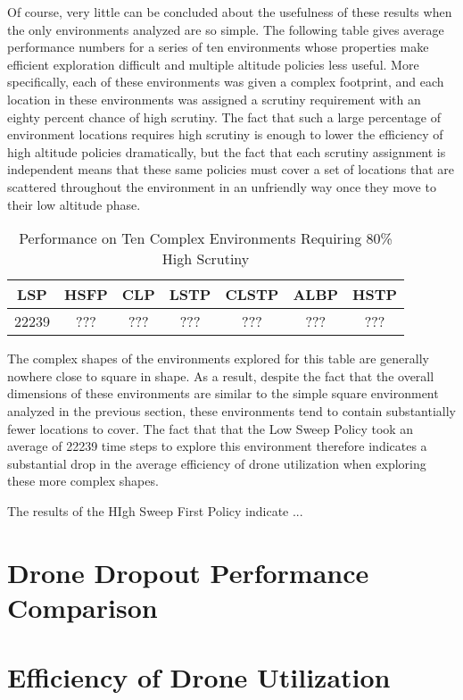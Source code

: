 Of course, very little can be concluded about the usefulness of these results when the only environments analyzed are so simple. The following table gives average performance numbers for a series of ten environments whose properties make efficient exploration difficult and multiple altitude policies less useful. More specifically, each of these environments was given a complex footprint, and each location in these environments was assigned a scrutiny requirement with an eighty percent chance of high scrutiny. The fact that such a large percentage of environment locations requires high scrutiny is enough to lower the efficiency of high altitude policies dramatically, but the fact that each scrutiny assignment is independent means that these same policies must cover a set of locations that are scattered throughout the environment in an unfriendly way once they move to their low altitude phase.

\begin{table}[h]
\begin{center}
 \begin{tabular}{||c c c c c c c ||}
 \hline
 LSP   & HSFP  & CLP & LSTP & CLSTP & ALBP & HSTP \\
 \hline
 22239 & ??? & ??? & ??? & ??? & ??? & ??? \\
 \hline
 \end{tabular}
\end{center}
\caption{Performance on Ten Complex Environments Requiring 80\% High Scrutiny}
\end{table}

The complex shapes of the environments explored for this table are generally nowhere close to square in shape. As a result, despite the fact that the overall dimensions of these environments are similar to the simple square environment analyzed in the previous section, these environments tend to contain substantially fewer locations to cover. The fact that that the Low Sweep Policy took an average of 22239 time steps to explore this environment therefore indicates a substantial drop in the average efficiency of drone utilization when exploring these more complex shapes.

The results of the HIgh Sweep First Policy indicate ...

\section{Drone Dropout Performance Comparison}

\section{Efficiency of Drone Utilization}

